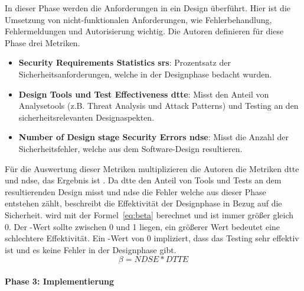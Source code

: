 \documentclass[12pt, a4paper, ngerman]{article}
\begin{document}
In dieser Phase werden die Anforderungen in ein Design überführt. 
Hier ist die Umsetzung von nicht-funktionalen Anforderungen, wie Fehlerbehandlung, Fehlermeldungen und Autorisierung wichtig.
Die Autoren definieren für diese Phase drei Metriken.
\begin{itemize}
  \item \textbf{Security Requirements Statistics \acs{srs}}: Prozentsatz der Sicherheitsanforderungen, welche in der Designphase bedacht wurden.
  \item \textbf{Design Tools und Test Effectiveness \acs{dtte}}: Misst den Anteil von Analysetools (z.B. Threat Analysis und Attack Patterns) und Testing an den sicherheitsrelevanten Designaspekten. 
  \item \textbf{Number of Design stage Security Errors \acs{ndse}}: Misst die Anzahl der Sicherheitsfehler, welche aus dem Software-Design resultieren. 
\end{itemize}
Für die Auswertung dieser Metriken multiplizieren die Autoren die Metriken \ac{dtte} und \ac{ndse}, das Ergebnis ist \beta. 
Da \ac{dtte} den Anteil von Tools und Tests an dem resultierenden Design misst und \ac{ndse} die Fehler welche aus dieser Phase entstehen zählt, 
beschreibt \beta die Effektivität der Designphase in Bezug auf die Sicherheit.
\beta wird mit der Formel~\ref{eq:beta} berechnet und ist immer größer gleich 0. 
Der \beta-Wert sollte zwischen 0 und 1 liegen, ein größerer Wert bedeutet eine schlechtere Effektivität.
Ein \beta-Wert von 0 impliziert, dass das Testing sehr effektiv ist und es keine Fehler in der Designphase gibt.
\begin{equation} \label{eq:beta}
  \beta = NDSE * DTTE
\end{equation}

\paragraph{Phase 3: Implementierung}
\end{document}

